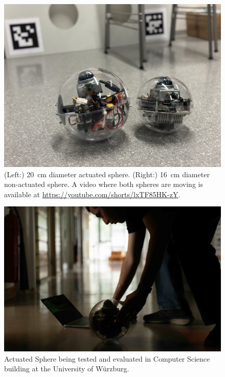 \documentclass[english, bachelor, utf8]{base/thesis_telematics}
\begin{document}
\begin{figure}[h]
\centerline{\includegraphics[width=0.8\columnwidth]{pics/two_spheres.jpg}}
\caption{(Left:) \SI{20}{\centi\meter} diameter actuated sphere.
(Right:) \SI{16}{\centi\meter} diameter non-actuated sphere.
A video where both spheres are moving is available at \url{https://youtube.com/shorts/lxTF85HK-zY}.}

\label{fig:twospheres}
\end{figure}

\begin{figure}[h]
\centerline{\includegraphics[width=0.8\columnwidth]{pics/marosphere_pic2.jpg}}
\caption{Actuated Sphere being tested and evaluated in Computer Science building at the University of Würzburg.}
\label{fig:test}
\end{figure}
\end{document}
